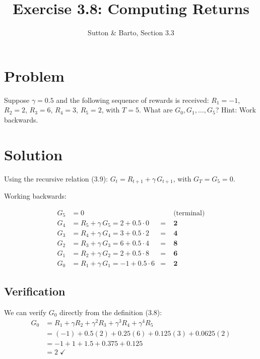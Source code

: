 \documentclass[11pt]{article}
\title{Exercise 3.8: Computing Returns}
\author{Sutton \& Barto, Section 3.3}
\date{}
\begin{document}
\maketitle

\section*{Problem}

Suppose $\gamma = 0.5$ and the following sequence of rewards is received:
$R_1 = -1$, $R_2 = 2$, $R_3 = 6$, $R_4 = 3$, $R_5 = 2$, with $T = 5$.
What are $G_0, G_1, \ldots, G_5$? Hint: Work backwards.

\section*{Solution}

Using the recursive relation (3.9): $G_t = R_{t+1} + \gamma\, G_{t+1}$,
with $G_T = G_5 = 0$.

Working backwards:

\begin{align*}
    G_5 &= 0 & &\text{(terminal)} \\[6pt]
    G_4 &= R_5 + \gamma\, G_5 = 2 + 0.5 \cdot 0 &= \;&\mathbf{2} \\[4pt]
    G_3 &= R_4 + \gamma\, G_4 = 3 + 0.5 \cdot 2 &= \;&\mathbf{4} \\[4pt]
    G_2 &= R_3 + \gamma\, G_3 = 6 + 0.5 \cdot 4 &= \;&\mathbf{8} \\[4pt]
    G_1 &= R_2 + \gamma\, G_2 = 2 + 0.5 \cdot 8 &= \;&\mathbf{6} \\[4pt]
    G_0 &= R_1 + \gamma\, G_1 = -1 + 0.5 \cdot 6 &= \;&\mathbf{2}
\end{align*}

\subsection*{Verification}

We can verify $G_0$ directly from the definition (3.8):
\begin{align*}
    G_0 &= R_1 + \gamma R_2 + \gamma^2 R_3 + \gamma^3 R_4 + \gamma^4 R_5 \\
        &= (-1) + 0.5(2) + 0.25(6) + 0.125(3) + 0.0625(2) \\
        &= -1 + 1 + 1.5 + 0.375 + 0.125 \\
        &= 2 \;\checkmark
\end{align*}
\end{document}
